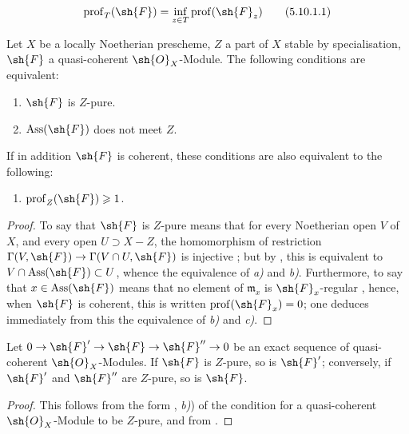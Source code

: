 \begin{equation}
\label{IV.5.10.1.1}
\operatorname{prof}_T(\sh{F})=\inf_{z\in T}\operatorname{prof}(\sh{F}_z) \tag{5.10.1.1}
\end{equation}

\begin{proposition}[5.10.2]
\label{IV.5.10.2}
Let $X$ be a locally Noetherian prescheme, $Z$ a part of $X$ stable by specialisation, $\sh{F}$ a quasi-coherent $\sh{O}_X$-Module.
The following conditions are equivalent:
\begin{enumerate}[label=\emph{\alph*)}]
  \item $\sh{F}$ is $Z$-pure.
  \item $\operatorname{Ass}(\sh{F})$ does not meet $Z$.
\end{enumerate}
If in addition $\sh{F}$ is coherent, these conditions are also equivalent to the following:
\begin{enumerate}
  \item[\rm c)] $\operatorname{prof}_Z(\sh{F})\geqslant 1$.
\end{enumerate}
\end{proposition}

\begin{proof}
To say that $\sh{F}$ is $Z$-pure means that for every Noetherian open $V$ of $X$, and every open $U\supset X-Z$, the homomorphism of restriction $\Gamma(V,\sh{F})\to\Gamma(V\cap U,\sh{F})$ is injective ; but by , this is equivalent to $V\cap\operatorname{Ass}(\sh{F})\subset U$, whence the equivalence of \emph{a)} and \emph{b)}.
Furthermore, to say that $x\in\operatorname{Ass}(\sh{F})$ means that no element of $\mathfrak{m}_x$ is $\sh{F}_x$-regular , hence, when $\sh{F}$ is coherent, this is written $\operatorname{prof}(\sh{F}_x)=0$; one deduces immediately from this the equivalence of \emph{b)} and \emph{c)}.
\end{proof}

\begin{corollary}[5.10.3]
\label{IV.5.10.3}
Let $0\to\sh{F}'\to\sh{F}\to\sh{F}''\to 0$ be an exact sequence of quasi-coherent $\sh{O}_X$-Modules.
If $\sh{F}$ is $Z$-pure, so is $\sh{F}'$; conversely, if $\sh{F}'$ and $\sh{F}''$ are $Z$-pure, so is $\sh{F}$.
\end{corollary}


\begin{proof}
This follows from the form , \emph{b)}) of the condition for a quasi-coherent $\sh{O}_X$-Module to be $Z$-pure, and from .
\end{proof}

